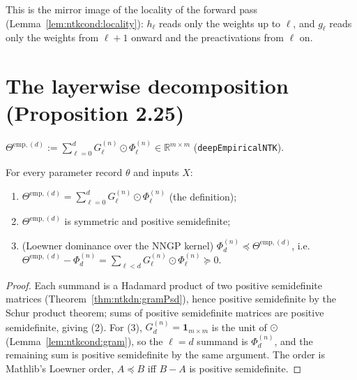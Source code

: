 This is the mirror image of the locality of the forward pass (Lemma~\ref{lem:ntkcond:locality}): $h_\ell$ reads only the weights up to $\ell$, and $g_\ell$ reads only the weights from $\ell+1$ onward and the preactivations from $\ell$ on.


\section{The layerwise decomposition (Proposition 2.25)}\label{sec:ntkdn:layerwise}

\begin{definition}\label{def:ntkdn:empiricalNTK}
  \leanok
$\Theta^{\mathrm{emp},(d)}:=\sum_{\ell=0}^dG_\ell^{(n)}\odot\Phi_\ell^{(n)}\in\mathbb R^{m\times m}$ (\texttt{deepEmpiricalNTK}).
\end{definition}

\begin{theorem}\label{thm:ntkdn:layerwise}
  \leanok
For every parameter record $\theta$ and inputs $X$:
\begin{enumerate}
  \item $\Theta^{\mathrm{emp},(d)}=\sum_{\ell=0}^dG_\ell^{(n)}\odot\Phi_\ell^{(n)}$ (the definition);
  \item $\Theta^{\mathrm{emp},(d)}$ is symmetric and positive semidefinite;
  \item (Loewner dominance over the NNGP kernel) $\Phi_d^{(n)}\preceq\Theta^{\mathrm{emp},(d)}$, i.e.\ $\Theta^{\mathrm{emp},(d)}-\Phi_d^{(n)}=\sum_{\ell<d}G_\ell^{(n)}\odot\Phi_\ell^{(n)}\succeq0$.
\end{enumerate}
\end{theorem}

\begin{proof}
  \leanok
Each summand is a Hadamard product of two positive semidefinite matrices (Theorem~\ref{thm:ntkdn:gramPsd}), hence positive semidefinite by the Schur product theorem; sums of positive semidefinite matrices are positive semidefinite, giving (2). For (3), $G_d^{(n)}=\mathbf 1_{m\times m}$ is the unit of $\odot$ (Lemma~\ref{lem:ntkcond:gram}), so the $\ell=d$ summand is $\Phi_d^{(n)}$, and the remaining sum is positive semidefinite by the same argument. The order is Mathlib's Loewner order, $A\preceq B$ iff $B-A$ is positive semidefinite.
\end{proof}

